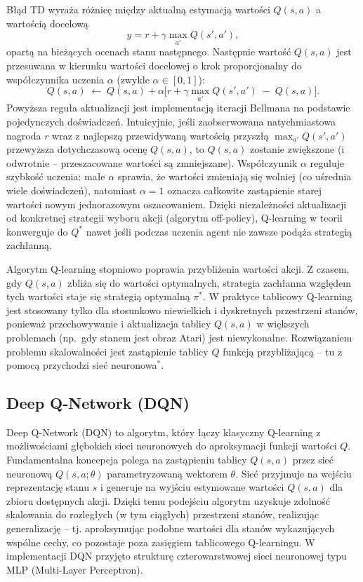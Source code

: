 \documentclass[a4paper,12pt]{article}
\begin{document}
Błąd TD wyraża różnicę między aktualną estymacją wartości \(Q(s,a)\) a wartością docelową
\[
y = r + \gamma \max_{a'} Q(s',a'),
\]
opartą na bieżących ocenach stanu następnego. Następnie wartość \(Q(s,a)\) jest przesuwana w kierunku wartości docelowej o krok proporcjonalny do współczynnika uczenia \(\alpha\) (zwykle \(\alpha \in [0,1]\)):
\[
Q(s,a) \;\leftarrow\; Q(s,a) + \alpha\bigl[r + \gamma \max_{a'} Q(s',a') \;-\; Q(s,a)\bigr].
\]
Powyższa reguła aktualizacji jest implementacją iteracji Bellmana na podstawie pojedynczych doświadczeń. Intuicyjnie, jeśli zaobserwowana natychmiastowa nagroda \(r\) wraz z najlepszą przewidywaną wartością przyszłą \(\max_{a'} Q(s',a')\) przewyższa dotychczasową ocenę \(Q(s,a)\), to \(Q(s,a)\) zostanie zwiększone (i odwrotnie – przeszacowane wartości są zmniejszane). Współczynnik \(\alpha\) reguluje szybkość uczenia: małe \(\alpha\) sprawia, że wartości zmieniają się wolniej (co uśrednia wiele doświadczeń), natomiast \(\alpha = 1\) oznacza całkowite zastąpienie starej wartości nowym jednorazowym oszacowaniem. Dzięki niezależności aktualizacji od konkretnej strategii wyboru akcji (algorytm off-policy), Q-learning w teorii konwerguje do \(Q^*\) nawet jeśli podczas uczenia agent nie zawsze podąża strategią zachłanną.

Algorytm Q-learning stopniowo poprawia przybliżenia wartości akcji. Z czasem, gdy \(Q(s,a)\) zbliża się do wartości optymalnych, strategia zachłanna względem tych wartości staje się strategią optymalną \(\pi^*\). W praktyce tablicowy Q-learning jest stosowany tylko dla stosunkowo niewielkich i dyskretnych przestrzeni stanów, ponieważ przechowywanie i aktualizacja tablicy \(Q(s,a)\) w większych problemach (np.\ gdy stanem jest obraz Atari) jest niewykonalne. Rozwiązaniem problemu skalowalności jest zastąpienie tablicy \(Q\) funkcją przybliżającą – tu z pomocą przychodzi sieć neuronowa\(^*\).

\subsection{Deep Q-Network (DQN)}

Deep Q-Network (DQN) to algorytm, który łączy klasyczny Q-learning z możliwościami głębokich sieci neuronowych do aproksymacji funkcji wartości \(Q\). Fundamentalna koncepcja polega na zastąpieniu tablicy \(Q(s,a)\) przez sieć neuronową \(Q(s,a;\theta)\) parametryzowaną wektorem \(\theta\). Sieć przyjmuje na wejściu reprezentację stanu \(s\) i generuje na wyjściu estymowane wartości \(Q(s,a)\) dla zbioru dostępnych akcji. Dzięki temu podejściu algorytm uzyskuje zdolność skalowania do rozległych (w tym ciągłych) przestrzeni stanów, realizując generalizację – tj. aproksymując podobne wartości dla stanów wykazujących wspólne cechy, co pozostaje poza zasięgiem tablicowego Q-learningu.
W implementacji DQN przyjęto strukturę czterowarstwowej sieci neuronowej typu MLP (Multi-Layer Perceptron).
\end{document}
